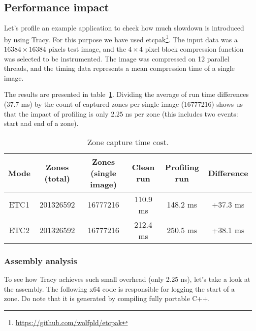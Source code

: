 \documentclass[hidelinks,titlepage,a4paper,twoside]{article}
\begin{document}
\subsection{Performance impact}
\label{perfimpact}

Let's profile an example application to check how much slowdown is introduced by using Tracy. For this purpose we have used etcpak\footnote{\url{https://github.com/wolfpld/etcpak}}. The input data was a $16384 \times 16384$ pixels test image, and the $4 \times 4$ pixel block compression function was selected to be instrumented. The image was compressed on 12 parallel threads, and the timing data represents a mean compression time of a single image.

The results are presented in table~\ref{PerformanceImpact}. Dividing the average of run time differences (37.7 \si{\milli\second}) by the count of captured zones per single image (\num{16777216}) shows us that the impact of profiling is only 2.25 \si{\nano\second} per zone (this includes two events: start and end of a zone).

\begin{table}[h]
\centering
\begin{tabular}[h]{c|c|c|c|c|c}
\textbf{Mode} & \textbf{Zones (total)} & \textbf{Zones (single image)} & \textbf{Clean run} & \textbf{Profiling run} & \textbf{Difference} \\ \hline
ETC1 & \num{201326592} & \num{16777216} & 110.9 \si{\milli\second} & 148.2 \si{\milli\second} & +37.3 \si{\milli\second} \\
ETC2 & \num{201326592} & \num{16777216} & 212.4 \si{\milli\second} & 250.5 \si{\milli\second} & +38.1 \si{\milli\second}
\end{tabular}
\caption{Zone capture time cost.}
\label{PerformanceImpact}
\end{table}

\subsubsection{Assembly analysis}

To see how Tracy achieves such small overhead (only 2.25 \si{\nano\second}), let's take a look at the assembly. The following x64 code is responsible for logging the start of a zone. Do note that it is generated by compiling fully portable C++.
\end{document}
